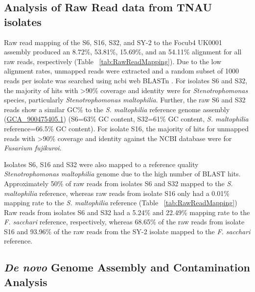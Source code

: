 \subsection{Analysis of Raw Read data from TNAU isolates}

Raw read mapping of the S6, S16, S32, and SY-2 to the \ac{Focub4} UK0001 assembly produced an 8.72\%, 53.81\%, 15.69\%, and an 54.11\% alignment for all raw reads, respectively (Table ~\ref{tab:RawReadMapping}). Due to the low alignment rates, unmapped reads were extracted and a random subset of 1000 reads per isolate was searched using \acf{ncbi} web BLASTn \parencite{Nih2014}. For isolates S6 and S32, the majority of hits with >90\% coverage and identity were for \textit{Stenotrophomonas} species, particularly \textit{Stenotrophomonas maltophilia}. Further, the raw S6 and S32 reads show a similar GC\% to the \textit{S. maltophilia }reference genome assembly (\href{https://www.ncbi.nlm.nih.gov/datasets/genome/GCF_900475405.1/}{GCA\_900475405.1}) (S6=63\% GC content, S32=61\% GC content, \textit{S. maltophilia} reference=66.5\% GC content). For isolate S16, the majority of hits for unmapped reads with >90\% coverage and identity against the NCBI database were for \textit{Fusarium fujikuroi}. 

\bigskip

\bigskip

Isolates S6, S16 and S32 were also mapped to a reference quality \textit{Stenotrophomonas maltophilia} genome due to the high number of BLAST hits. Approximately 50\% of raw reads from isolates S6 and S32 mapped to the \textit{S. maltophilia} reference, whereas raw reads from isolate S16 only had a 0.01\% mapping rate to the \textit{S. maltophilia} reference (Table ~\ref{tab:RawReadMapping}) Raw reads from isolates S6 and S32 had a 5.24\% and 22.49\% mapping rate to the \textit{F. sacchari} reference, respectively, whereas 68.65\% of the raw reads from isolate S16 and 93.96\% of the raw reads from the SY-2 isolate mapped to the \textit{F. sacchari} reference.

\subsection{\textit{De novo} Genome Assembly and Contamination Analysis}

